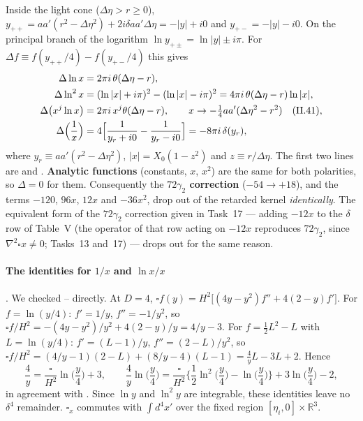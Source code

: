 Inside the light cone ($\Delta\eta>r\ge0$),
$y_{++}=aa'(r^2-\Delta\eta^2)+2i\delta aa'\Delta\eta=-|y|+i0$ and $y_{+-}=-|y|-i0$.
On the principal branch of the logarithm $\ln y_{+\pm}=\ln|y|\pm i\pi$. For $\Delta f\equiv f(y_{++}/4)-f(y_{+-}/4)$ this gives \tD
\begin{equation}
\begin{aligned}
\Delta\ln x&=2\pi i\,\theta(\Delta\eta-r),\\
\Delta\ln^2x&=(\ln|x|+i\pi)^2-(\ln|x|-i\pi)^2=4\pi i\,\theta(\Delta\eta-r)\ln|x|,\\
\Delta\big(x^j\ln x\big)&=2\pi i\,x^j\theta(\Delta\eta-r),\qquad x\to-\tfrac14aa'(\Delta\eta^2-r^2)\quad\text{(II.41)},\\
\Delta\Big(\frac1x\Big)&=4\Big[\frac1{y_r+i0}-\frac1{y_r-i0}\Big]=-8\pi i\,\delta(y_r),
\end{aligned}
\label{eq:ch09-Delta}
\end{equation}
where $y_r\equiv aa'(r^2-\Delta\eta^2)$, $|x|=X_0(1-z^2)$ and $z\equiv r/\Delta\eta$. The first two lines are  and .
\textbf{Analytic functions} (constants, $x$, $x^2$) are the same for both polarities, so $\Delta=0$ for them.
Consequently the \textbf{$72\gamma_2$ correction} ($-54\to+18$), and the terms $-120$, $96x$, $12x$ and $-36x^2$, drop out of the retarded kernel \emph{identically}.
The equivalent form of the $72\gamma_2$ correction given in Task~17 --- adding $-12x$ to the $\delta$ row of \PI{} Table~V (the operator of that row acting on $-12x$ reproduces $72\gamma_2$, since $\nabla^2\square x\neq0$; Tasks~13 and~17) --- drops out for the same reason.

\paragraph{The identities for \texorpdfstring{$1/x$}{1/x} and \texorpdfstring{$\ln x/x$}{ln x/x}} \tD.
We checked -- directly. At $D=4$, $\square f(y)=H^2\big[(4y-y^2)f''+4(2-y)f'\big]$.
For $f=\ln(y/4)$: $f'=1/y$, $f''=-1/y^2$, so $\square f/H^2=-(4y-y^2)/y^2+4(2-y)/y=4/y-3$.
For $f=\tfrac12L^2-L$ with $L=\ln(y/4)$: $f'=(L-1)/y$, $f''=(2-L)/y^2$, so
$\square f/H^2=(4/y-1)(2-L)+(8/y-4)(L-1)=\tfrac4yL-3L+2$. Hence
\begin{equation*}
\frac4y=\frac{\square}{H^2}\ln\Big(\frac y4\Big)+3,\qquad
\frac4y\ln\Big(\frac y4\Big)=\frac{\square}{H^2}\Big\{\frac12\ln^2\Big(\frac y4\Big)-\ln\Big(\frac y4\Big)\Big\}+3\ln\Big(\frac y4\Big)-2,
\tag{II.35--36}
\end{equation*}
in agreement with \PII. Since $\ln y$ and $\ln^2y$ are integrable, these identities leave no $\delta^4$ remainder.
$\square_x$ commutes with $\int d^4x'$ over the fixed region $[\eta_i,0]\times\mathbb R^3$.

